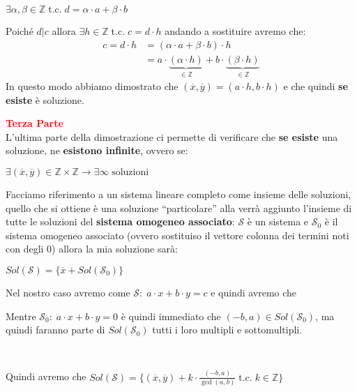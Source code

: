 \begin{boxA}
    {\centering
        $\exists \alpha, \beta \in \mathbb{Z} \; \text{t.c.} \; d = \alpha \cdot a + \beta \cdot b$
    \par}
    Poiché $d|c$ allora $\exists h \in \mathbb{Z} \; \text{t.c.} \; c = d \cdot h$ andando a sostituire avremo che:
    \begin{align*}
        c = d \cdot h &= (\alpha \cdot a + \beta \cdot b) \cdot h \\
        &= a \cdot \underset{\in \mathbb{Z}}{\underbrace{(\alpha \cdot h)}} + b \cdot \underset{\in \mathbb{Z}}{\underbrace{(\beta \cdot h)}}
    \end{align*}
    In questo modo abbiamo dimostrato che $(\overline{x}, \overline{y}) = (a \cdot h, b \cdot h)$ e che quindi \textbf{se esiste} è soluzione.
\end{boxA}

\begin{boxA}
    \textcolor{red}{\textbf{Terza Parte}} \\
    L'ultima parte della dimostrazione ci permette di verificare che \textbf{se esiste} una soluzione, ne \textbf{esistono infinite}, ovvero se:

    {\centering
        $\exists (\overline{x}, \overline{y}) \in \mathbb{Z} \times \mathbb{Z} \rightarrow \exists \infty \; \text{soluzioni}$
    \par}
    Facciamo riferimento a un sistema lineare completo come insieme delle soluzioni, quello che si ottiene è una soluzione ``particolare'' alla verrà aggiunto l'insieme di tutte le soluzioni del \textbf{sistema omogeneo associato}: $\mathcal{S}$ è un sistema e $\mathcal{S}_0$ è il sistema omogeneo associato (ovvero sostituiso il vettore colonna dei termini noti con degli $0$) allora la mia soluzione sarà:
    
    {\centering
        $Sol(\mathcal{S}) = \{\overline{x} + Sol(\mathcal{S}_0)\}$
    \par}
    \begin{center}
        \begin{minipage}[t]{0.45\textwidth}
            \centering
            Nel nostro caso avremo come $\mathcal{S}: \; a \cdot x + b \cdot y = c$ e quindi avremo che 
        \end{minipage}
        \begin{minipage}[t]{0.45\textwidth}
            \centering
            Mentre $\mathcal{S}_0: \; a \cdot x + b \cdot y = 0$ è quindi immediato che $(-b, a) \in Sol(\mathcal{S}_0)$, ma quindi faranno parte di $Sol(\mathcal{S}_0)$ tutti i loro multipli e sottomultipli.
        \end{minipage} \\
    \end{center}

    Quindi avremo che $Sol(\mathcal{S}) = \{(\overline{x}, \overline{y}) + k \cdot \frac{(-b, a)}{\gcd (a, b)} \; \text{t.c.} \; k \in \mathbb{Z}\}$
\end{boxA}

